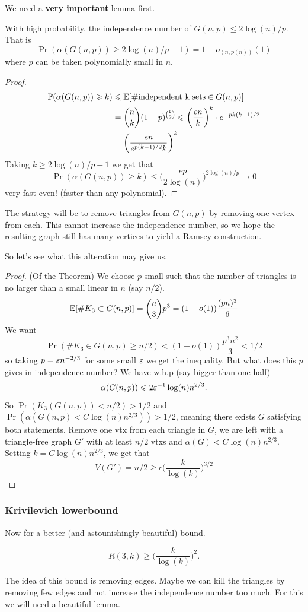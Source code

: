 We need a \textbf{very important} lemma first.
\begin{lemma}
	\label{lemma:independence_number_gnp}
	With high probability, the independence number of $G(n,p) \leq
	2\log(n)/p$. That is
	\[
		\Pr(\alpha(G(n,p)) \geq 2\log(n)/p + 1) = 1 - o_{(n,p(n))}(1)
	\]
	where $p$ can be taken polynomially small in $n$.
\end{lemma}
\begin{proof}
	\begin{align*}
		\mathbb{P}(\alpha(G(n,p)) \geqslant k) &\leqslant \mathbb{E}[\#\text{independent k sets}
		\in G(n,p)]\\
		&= \binom{n}{k}(1-p)^{\binom{k}{2}} \leqslant
		\bigg(\frac{en}{k}\bigg)^k\cdot e^{-pk(k-1)/2}\\
		&= \bigg(\frac{en}{e^{p(k-1)/2}k}\bigg)^k
	\end{align*}
	Taking $k \geq 2\log(n)/p + 1$ we get that
	\[
		\Pr(\alpha(G(n,p)) \geq k) \leq
		\bigg(\frac{ep}{2\log(n)}\bigg)^{2\log(n)/p} \to 0
	\]
	very fast even! (faster than any polynomial).
\end{proof}

The strategy will be to remove triangles from $G(n,p)$ by removing
one vertex from each. This cannot increase
the independence number, so we hope the resulting graph still has
many vertices to yield a Ramsey construction.

So let's see what this alteration may give us.
\begin{proof}
	(Of the Theorem) We choose $p$ small such that the number of
	triangles is no larger than a small linear in $n$ (say $n/2$).
	\[
		\mathbb{E}[\# K_3 \subset G(n,p)] = \binom{n}{3}p^3 = (1 + o(1))\frac{(pn)^3}{6}
	\]
	We want
	\[
		\Pr( \# K_3 \in G(n,p) \geq n/2) < (1 + o(1))\frac{p^3n^2}{3} < 1/2
	\]
	so taking $p = \varepsilon n^{-2/3}$ for some small $\varepsilon$ we get the
	inequality. But what does this $p$ gives in independence number?
	We have w.h.p (say bigger than one half)
	\[
		\alpha(G(n,p)) \leqslant 2\varepsilon^{-1}\log(n)n^{2/3}.
	\]
	So $\Pr(K_3(G(n,p)) < n/2) > 1/2$ and $\Pr(\alpha(G(n,p) <
	C\log(n)n^{2/3})) > 1/2$, meaning there exists
	$G$ satisfying both statements. Remove one vtx from each triangle
	in $G$, we are left with a triangle-free graph $G'$ with at least $n/2$ vtxs
	and $\alpha(G) < C\log(n)n^{2/3}$.
	Setting $k = C\log(n)n^{2/3}$, we get that
	\[
		V(G') = n/2 \geq c\bigg(\frac{k}{\log(k)}\bigg)^{3/2}
	\]
\end{proof}

\subsubsection{Krivilevich lowerbound}
Now for a better (and astounishingly beautiful) bound.
\begin{theorem}
	\label{trm:krivilevich_r3k}
	\[
		R(3,k) \geq \bigg(\frac{k}{\log(k)}\bigg)^2.
	\]
\end{theorem}
The idea of this bound is removing edges. Maybe we can kill the
triangles by removing few edges and not
increase the independence number too much. For this we will need a
beautiful lemma.

